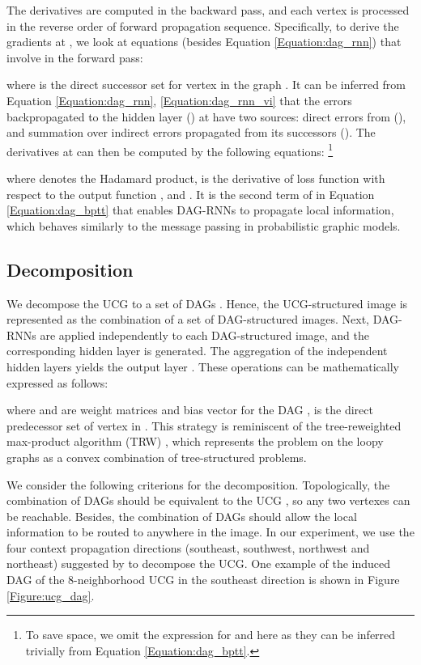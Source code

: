 \documentclass[10pt,twocolumn,letterpaper]{article}
\begin{document}
The derivatives are computed in the backward pass, and each vertex is processed in the reverse order of forward propagation sequence. Specifically, to derive the gradients at , we look at equations (besides Equation \ref{Equation:dag_rnn}) that involve  in the forward pass:

where  is the direct successor set for vertex  in the graph . It can be inferred from Equation \ref{Equation:dag_rnn}, \ref{Equation:dag_rnn_vi} that the errors backpropagated to the hidden layer  () at  have two sources: direct errors from  (), and summation over indirect errors propagated from its successors (). The derivatives at  can then be computed by the following equations:
\footnote{To save space, we omit the expression for  and  here as they can be inferred trivially from Equation \ref{Equation:dag_bptt}.}


where  denotes the Hadamard product,  is the derivative of loss function  with respect to the output function , and .
It is  the second term of  in Equation \ref{Equation:dag_bptt} that enables DAG-RNNs to propagate local information, which behaves similarly to the message passing \cite{yedidia2003understanding} in probabilistic graphic models.



\subsection{Decomposition}
We decompose the UCG  to a set of DAGs . Hence, the UCG-structured image is represented as the combination of a set of DAG-structured images.
Next, DAG-RNNs are applied independently to each DAG-structured image, and the corresponding hidden layer  is generated.
The aggregation of the independent hidden layers yields the output layer . These operations can be mathematically expressed as follows:

where  and  are weight matrices and bias vector for the DAG ,  is the direct predecessor set of vertex  in .
This strategy is reminiscent of the tree-reweighted max-product algorithm (TRW) \cite{wainwright2005new}, which represents the problem on the loopy graphs as a convex combination of tree-structured problems.

We consider the following criterions for the decomposition.  Topologically, the combination of DAGs should be equivalent to the UCG , so any two vertexes can be reachable. Besides, the combination of DAGs should allow the local information to be routed to anywhere in the image.
In our experiment, we use the four context propagation directions (southeast, southwest, northwest and northeast) suggested by \cite{graves2012offline}\cite{shuai2015quaddirectional} to decompose the UCG.
One example of the induced DAG of the 8-neighborhood UCG in the southeast direction is shown in Figure \ref{Figure:ucg_dag}.
\end{document}
